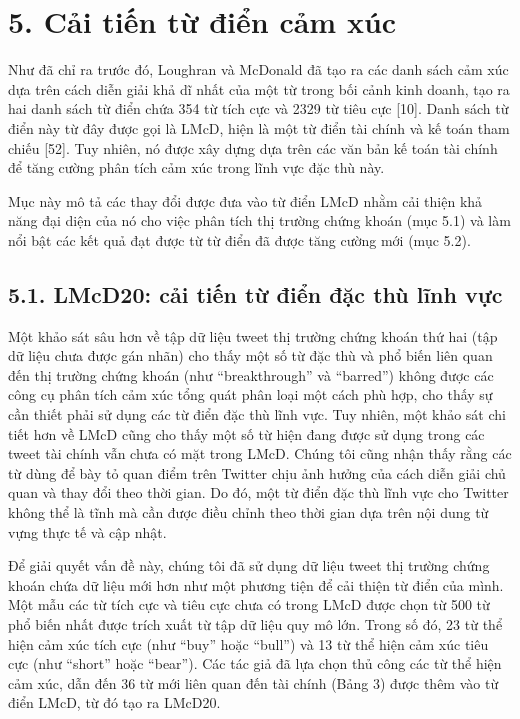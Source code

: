 \section{5. Cải tiến từ điển cảm xúc}

Như đã chỉ ra trước đó, Loughran và McDonald đã tạo ra các danh sách cảm xúc dựa trên cách diễn giải khả dĩ nhất của một từ trong bối cảnh kinh doanh, tạo ra hai danh sách từ điển chứa 354 từ tích cực và 2329 từ tiêu cực [10]. Danh sách từ điển này từ đây được gọi là LMcD, hiện là một từ điển tài chính và kế toán tham chiếu [52]. Tuy nhiên, nó được xây dựng dựa trên các văn bản kế toán tài chính để tăng cường phân tích cảm xúc trong lĩnh vực đặc thù này.

Mục này mô tả các thay đổi được đưa vào từ điển LMcD nhằm cải thiện khả năng đại diện của nó cho việc phân tích thị trường chứng khoán (mục 5.1) và làm nổi bật các kết quả đạt được từ từ điển đã được tăng cường mới (mục 5.2).

\subsection*{5.1. LMcD20: cải tiến từ điển đặc thù lĩnh vực}

Một khảo sát sâu hơn về tập dữ liệu tweet thị trường chứng khoán thứ hai (tập dữ liệu chưa được gán nhãn) cho thấy một số từ đặc thù và phổ biến liên quan đến thị trường chứng khoán (như ``breakthrough'' và ``barred'') không được các công cụ phân tích cảm xúc tổng quát phân loại một cách phù hợp, cho thấy sự cần thiết phải sử dụng các từ điển đặc thù lĩnh vực. Tuy nhiên, một khảo sát chi tiết hơn về LMcD cũng cho thấy một số từ hiện đang được sử dụng trong các tweet tài chính vẫn chưa có mặt trong LMcD. Chúng tôi cũng nhận thấy rằng các từ dùng để bày tỏ quan điểm trên Twitter chịu ảnh hưởng của cách diễn giải chủ quan và thay đổi theo thời gian. Do đó, một từ điển đặc thù lĩnh vực cho Twitter không thể là tĩnh mà cần được điều chỉnh theo thời gian dựa trên nội dung từ vựng thực tế và cập nhật.

Để giải quyết vấn đề này, chúng tôi đã sử dụng dữ liệu tweet thị trường chứng khoán chứa dữ liệu mới hơn như một phương tiện để cải thiện từ điển của mình. Một mẫu các từ tích cực và tiêu cực chưa có trong LMcD được chọn từ 500 từ phổ biến nhất được trích xuất từ tập dữ liệu quy mô lớn. Trong số đó, 23 từ thể hiện cảm xúc tích cực (như ``buy'' hoặc ``bull'') và 13 từ thể hiện cảm xúc tiêu cực (như ``short'' hoặc ``bear''). Các tác giả đã lựa chọn thủ công các từ thể hiện cảm xúc, dẫn đến 36 từ mới liên quan đến tài chính (Bảng 3) được thêm vào từ điển LMcD, từ đó tạo ra LMcD20.

